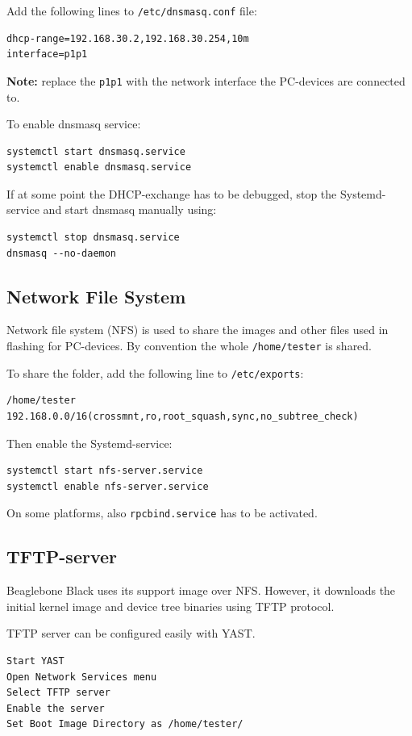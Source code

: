 \documentclass[a4paper,11pt]{article}
\newcommand{\note}{\textbf{Note: }}
\newcommand{\cmd}[1]{\texttt{#1}}
\begin{document}
Add the following lines to \cmd{/etc/dnsmasq.conf} file:
\begin{lstlisting}
dhcp-range=192.168.30.2,192.168.30.254,10m
interface=p1p1
\end{lstlisting}
\note{replace the \cmd{p1p1} with the network interface the PC-devices are connected to.}

To enable dnsmasq service:
\begin{lstlisting}
systemctl start dnsmasq.service
systemctl enable dnsmasq.service
\end{lstlisting}
If at some point the DHCP-exchange has to be debugged, stop the Systemd-service and start dnsmasq manually using:
\begin{lstlisting}
systemctl stop dnsmasq.service
dnsmasq --no-daemon
\end{lstlisting}

\subsection*{Network File System}
Network file system (NFS) is used to share the images and other files used in flashing for PC-devices. By convention the whole \cmd{/home/tester} is shared.

To share the folder, add the following line to \cmd{/etc/exports}:
\begin{lstlisting}
/home/tester 192.168.0.0/16(crossmnt,ro,root_squash,sync,no_subtree_check)
\end{lstlisting}

Then enable the Systemd-service:
\begin{lstlisting}
systemctl start nfs-server.service
systemctl enable nfs-server.service
\end{lstlisting}
On some platforms, also \cmd{rpcbind.service} has to be activated.

\subsection*{TFTP-server}

Beaglebone Black uses its support image over NFS. However, it downloads the initial kernel image and device tree binaries using TFTP protocol.

TFTP server can be configured easily with YAST.

\begin{lstlisting}
Start YAST
Open Network Services menu
Select TFTP server
Enable the server
Set Boot Image Directory as /home/tester/
\end{lstlisting}
\end{document}
